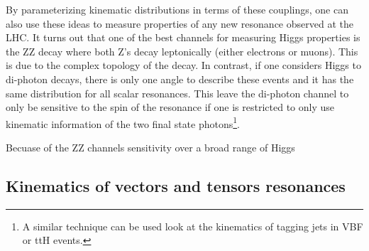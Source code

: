 By parameterizing kinematic distributions in terms of these couplings, one
can also use these ideas to measure properties of any new resonance observed 
at the LHC.  It turns out that one of the best channels for measuring Higgs
properties is the ZZ decay where both Z's decay leptonically (either 
electrons or muons).  This is due to the complex topology of the decay.  In
contrast, if one considers Higgs to di-photon decays, there is only one angle 
to describe these events and it has the same distribution for all scalar 
resonances.  This leave the di-photon channel to only be sensitive to the spin 
of the resonance if one is restricted to only use kinematic information of the
two final state photons\footnote{A similar technique can be used look at
the kinematics of tagging jets in VBF or ttH events.}.

Becuase of the ZZ channels sensitivity over a broad range of Higgs

\subsection{Kinematics of vectors and tensors resonances}
\label{sec:Kinematics of vector and tensor resonances} 


